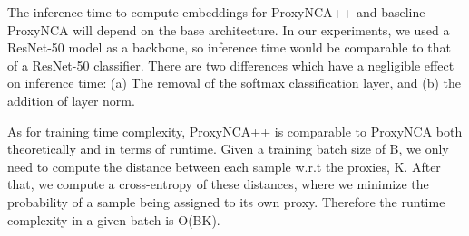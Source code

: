 \documentclass[runningheads]{llncs}
\begin{document}
The inference time to compute embeddings for ProxyNCA++ and baseline ProxyNCA will depend on the base architecture. In our experiments, we used a ResNet-50 model as a backbone, so inference time would be comparable to that of a ResNet-50 classifier. There are two differences which have a negligible effect on inference time: (a) The removal of the softmax classification layer, and (b) the addition of layer norm.

As for training time complexity, ProxyNCA++ is comparable to ProxyNCA both theoretically and in terms of runtime. Given a training batch size of B, we only need to compute the distance between each sample w.r.t the proxies, K. After that, we compute a cross-entropy of these distances, where we minimize the probability of a sample being assigned to its own proxy. Therefore the runtime complexity in a given batch is O(BK). 
\end{document}
